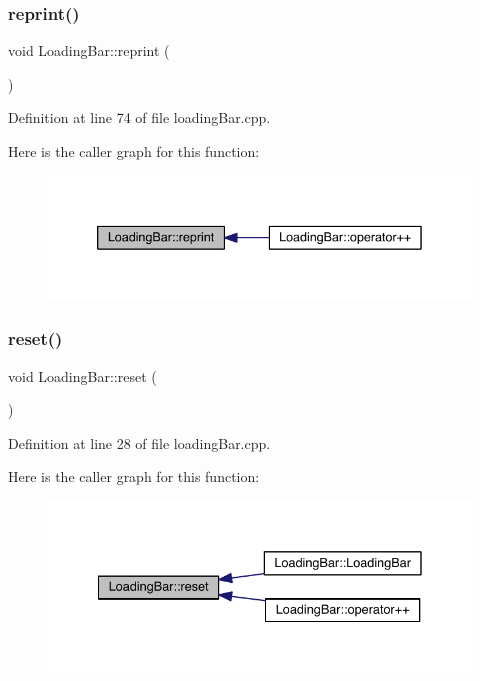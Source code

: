 \subsubsection{\texorpdfstring{reprint()}{reprint()}}
{\footnotesize\ttfamily void Loading\+Bar\+::reprint (\begin{DoxyParamCaption}{ }\end{DoxyParamCaption})}



Definition at line 74 of file loading\+Bar.\+cpp.

Here is the caller graph for this function\+:\nopagebreak
\begin{figure}[H]
\begin{center}
\leavevmode
\includegraphics[width=339pt]{class_loading_bar_ae9873c79a6760f8ca8d8eac56ff4d4f4_icgraph}
\end{center}
\end{figure}
\mbox{\label{class_loading_bar_a0396b27b86129c706371ff81a4991d78}} 
\subsubsection{\texorpdfstring{reset()}{reset()}}
{\footnotesize\ttfamily void Loading\+Bar\+::reset (\begin{DoxyParamCaption}{ }\end{DoxyParamCaption})}



Definition at line 28 of file loading\+Bar.\+cpp.

Here is the caller graph for this function\+:\nopagebreak
\begin{figure}[H]
\begin{center}
\leavevmode
\includegraphics[width=335pt]{class_loading_bar_a0396b27b86129c706371ff81a4991d78_icgraph}
\end{center}
\end{figure}
\mbox{\label{class_loading_bar_aa36409c317164b0e74f6feafc902fa64}} 
